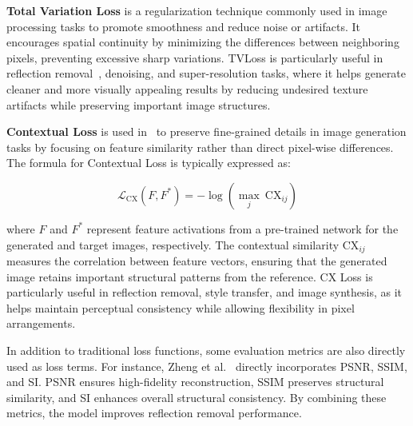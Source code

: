

\textbf{Total Variation Loss} is a regularization technique commonly used in image processing tasks to promote smoothness and reduce noise or artifacts. It encourages spatial continuity by minimizing the differences between neighboring pixels, preventing excessive sharp variations. TVLoss is particularly useful in reflection removal~\cite{zhu2024revisiting}, denoising, and super-resolution tasks, where it helps generate cleaner and more visually appealing results by reducing undesired texture artifacts while preserving important image structures.


\textbf{Contextual Loss} is used in~\cite{prasad2021v} to preserve fine-grained details in image generation tasks by focusing on feature similarity rather than direct pixel-wise differences. The formula for Contextual Loss is typically expressed as:

\[
\mathcal{L}_{\text{CX}}(F, F^*) = - \log \left( \max_j \ \text{CX}_{ij} \right)
\]

where \( F \) and \( F^* \) represent feature activations from a pre-trained network for the generated and target images, respectively. The contextual similarity \( \text{CX}_{ij} \) measures the correlation between feature vectors, ensuring that the generated image retains important structural patterns from the reference. CX Loss is particularly useful in reflection removal, style transfer, and image synthesis, as it helps maintain perceptual consistency while allowing flexibility in pixel arrangements.


In addition to traditional loss functions, some evaluation metrics are also directly used as loss terms. For instance, Zheng et al.~\cite{zheng2021single,wan2019corrn} directly incorporates PSNR, SSIM, and SI. PSNR ensures high-fidelity reconstruction, SSIM preserves structural similarity, and SI enhances overall structural consistency. By combining these metrics, the model improves reflection removal performance.
